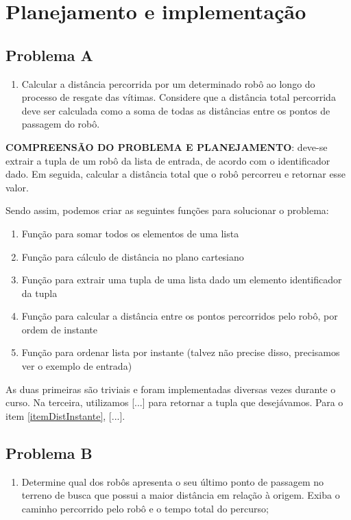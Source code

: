 \chapter{Planejamento e implementação}\label{cap-planejamento-implementacao}

\section{Problema A}\label{problemaA}
\begin{enumerate}[label=\textbf{\alph*)},series=problemas]
\item Calcular a distância percorrida por um determinado robô ao longo do processo de resgate das vítimas. Considere que a distância total percorrida deve ser calculada como a soma de todas as distâncias entre os pontos de passagem do robô.
\end{enumerate}

\noindent \textbf{COMPREENSÃO DO PROBLEMA E PLANEJAMENTO}: deve-se extrair a tupla de um robô da lista de entrada, de acordo com o identificador dado. Em seguida, calcular a distância total que o robô percorreu e retornar esse valor.

Sendo assim, podemos criar as seguintes funções para solucionar o problema:
\begin{enumerate}
    \item Função para somar todos os elementos de uma lista
    \item Função para cálculo de distância no plano cartesiano
    \item Função para extrair uma tupla de uma lista dado um elemento identificador da tupla
    \item Função para calcular a distância entre os pontos percorridos pelo robô, por ordem de instante\label{itemDistInstante}
    \item Função para ordenar lista por instante (talvez não precise disso, precisamos ver o exemplo de entrada)
\end{enumerate}

As duas primeiras são triviais e foram implementadas diversas vezes durante o curso. Na terceira, utilizamos [...] para retornar a tupla que desejávamos. Para o item \ref{itemDistInstante}, [...].

\section{Problema B}\label{problemaB}
\begin{enumerate}[label=\textbf{\alph*)},resume*=problemas]
\item Determine qual dos robôs apresenta o seu último ponto de passagem no terreno de busca que possui a maior distância em relação à origem. Exiba o caminho percorrido pelo robô e o tempo total do percurso;
\end{enumerate}



\section{}